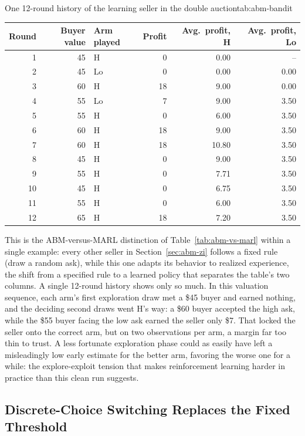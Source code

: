 \documentclass[../ai_in_finance]{subfiles}
\begin{document}
\begin{booktable}[htbp]{One 12-round history of the learning seller in the double auction}{tab:abm-bandit}
\begin{tabular}{rrlrrr}
\toprule
Round & Buyer value & Arm played & Profit & Avg.\ profit, H & Avg.\ profit, Lo \\
\midrule
1  & 45 & H  & 0  & 0.00  & --   \\
2  & 45 & Lo & 0  & 0.00  & 0.00 \\
3  & 60 & H  & 18 & 9.00  & 0.00 \\
4  & 55 & Lo & 7  & 9.00  & 3.50 \\
5  & 55 & H  & 0  & 6.00  & 3.50 \\
6  & 60 & H  & 18 & 9.00  & 3.50 \\
7  & 60 & H  & 18 & 10.80 & 3.50 \\
8  & 45 & H  & 0  & 9.00  & 3.50 \\
9  & 55 & H  & 0  & 7.71  & 3.50 \\
10 & 45 & H  & 0  & 6.75  & 3.50 \\
11 & 55 & H  & 0  & 6.00  & 3.50 \\
12 & 65 & H  & 18 & 7.20  & 3.50 \\
\bottomrule
\end{tabular}
\end{booktable}

This is the ABM-versus-MARL distinction of Table~\ref{tab:abm-vs-marl} within a single example: every other seller in Section~\ref{sec:abm-zi} follows a fixed rule (draw a random ask), while this one adapts its behavior to realized experience, the shift from a specified rule to a learned policy that separates the table's two columns. A single 12-round history shows only so much. In this valuation sequence, each arm's first exploration draw met a \$45 buyer and earned nothing, and the deciding second draws went H's way: a \$60 buyer accepted the high ask, while the \$55 buyer facing the low ask earned the seller only \$7. That locked the seller onto the correct arm, but on two observations per arm, a margin far too thin to trust. A less fortunate exploration phase could as easily have left a misleadingly low early estimate for the better arm, favoring the worse one for a while: the explore-exploit tension that makes reinforcement learning harder in practice than this clean run suggests.

\subsection{Discrete-Choice Switching Replaces the Fixed Threshold}
\label{sec:abm-discrete-choice}
\end{document}
